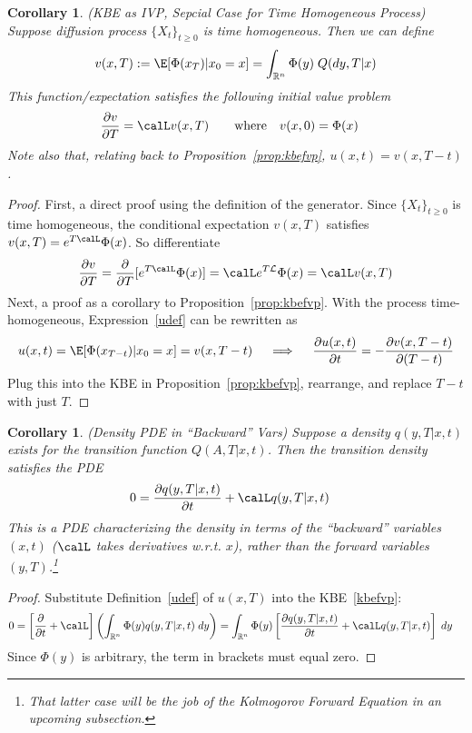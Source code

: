 \documentclass[12pt]{article}
\theoremstyle{plain}
\newtheorem{cor}[thm]{Corollary}
\theoremstyle{definition}
\theoremstyle{remark}
\newcommand{\Rn}{\mathbb{R}^n}
\begin{document}
\begin{cor}
\label{cor:kbeivp}
\emph{(KBE as IVP, Sepcial Case for Time Homogeneous Process)}
Suppose diffusion process $\{X_t\}_{t\geq 0}$ is time homogeneous.
Then we can define
\begin{align*}
  v(x,T) := \E[\Phi(x_T)|x_0=x] = \int_{\Rn}\Phi(y)\;Q(dy,T|x)
\end{align*}
This function/expectation satisfies the following initial value problem
\begin{align*}
  \frac{\partial v}{\partial T}
  &=
  \calL
  v(x,T)
  \qquad \text{where}\quad
  v(x,0)
  = \Phi(x)
\end{align*}
Note also that, relating back to Proposition~\ref{prop:kbefvp},
$u(x,t)=v(x,T-t)$.
\end{cor}
\begin{proof}
First, a direct proof using the definition of the generator.
Since $\{X_t\}_{t\geq 0}$ is time homogeneous, the
conditional expectation $v(x,T)$ satisfies $v(x,T)=e^{T\calL}\Phi(x)$.
So differentiate
\begin{align*}
  \frac{\partial v}{\partial T}
  = \frac{\partial }{\partial T}[e^{T\calL}\Phi(x)]
  = \calL e^{T\cal L} \Phi(x) = \calL v(x,T)
\end{align*}
Next, a proof as a corollary to Proposition~\ref{prop:kbefvp}.
With the process time-homogeneous, Expression~\ref{udef} can be
rewritten as
\begin{align*}
  u(x,t)=\E[\Phi(x_{T-t})|x_0=x]
  = v(x,T-t)
  \quad \implies\quad
  \frac{\partial u(x,t)}{\partial t}
  =-\frac{\partial v(x,T-t)}{\partial (T-t)}
\end{align*}
Plug this into the KBE in Proposition~\ref{prop:kbefvp}, rearrange, and
replace $T-t$ with just $T$.
\end{proof}

\begin{cor}\emph{(Density PDE in ``Backward'' Vars)}
Suppose a density $q(y,T|x,t)$ exists for the transition function
$Q(A,T|x,t)$.
Then the transition density satisfies the PDE
\begin{align*}
  0
  &=
  \frac{\partial q(y,T|x,t) }{\partial t}
  +
  \calL q(y,T|x,t)
\end{align*}
This is a PDE characterizing the density in terms of the ``backward''
variables $(x,t)$ ($\calL$ takes derivatives w.r.t. $x$), rather than
the forward variables $(y,T)$.\footnote{%
  That latter case will be the job of the Kolmogorov Forward Equation in
  an upcoming subsection.
}
\end{cor}
\begin{proof}
Substitute Definition~\ref{udef} of $u(x,T)$ into the KBE~\ref{kbefvp}:
\begin{align*}
  0
  &=
  \left[
  \frac{\partial }{\partial t}
  +
  \calL
  \right]
  \left(
  \int_{\Rn} \Phi(y)q(y,T|x,t)\;dy
  \right)
  =
  \int_{\Rn} \Phi(y)
  \left[
  \frac{\partial q(y,T|x,t) }{\partial t}
  +
  \calL q(y,T|x,t)
  \right]
  \;dy
\end{align*}
Since $\Phi(y)$ is arbitrary, the term in brackets must equal zero.
\end{proof}
\end{document}
